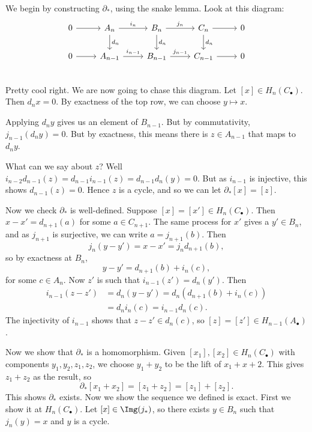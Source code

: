 \documentclass[12pt]{article}
\begin{document}
\begin{proofbox}
	We begin by constructing $\partial_\ast$, using the snake lemma. Look at this diagram:
	\begin{equation*}
	\begin{tikzcd}
		0 \arrow[r] & A_n \arrow[r, "i_n"] \arrow[d, "d_n"] & B_n \arrow[r, "j_n"] \arrow[d, "d_n"] & C_n \arrow[d, "d_n"] \arrow[r] & 0 \\
		0 \arrow[r] & A_{n-1} \arrow[r, "i_{n-1}"] & B_{n-1} \arrow[r, "j_{n-1}"] & C_{n-1} \arrow[r] & 0 \\
	\end{tikzcd}
	\end{equation*}
	Pretty cool right. We are now going to chase this diagram. Let $[x] \in H_n(C_\bullet)$. Then $d_n x = 0$. By exactness of the top row, we can choose $y \mapsto x$.

	Applying $d_n y$ gives us an element of $B_{n-1}$. But by commutativity, $j_{n-1}(d_n y) = 0$. But by exactness, this means there is $z \in A_{n-1}$ that maps to $d_{n} y$.

	What can we say about $z$? Well $i_{n-2} d_{n-1}(z) = d_{n-1} i_{n-1}(z) = d_{n-1} d_n (y) = 0$. But as $i_{n-1}$ is injective, this shows $d_{n-1}(z) = 0$. Hence $z$ is a cycle, and so we can let $\partial_\ast[x] = [z]$.

	Now we check $\partial_\ast$ is well-defined. Suppose $[x] = [x'] \in H_n(C_\bullet)$. Then $x - x' = d_{n+1}(a)$ for some $a \in C_{n+1}$. The same process for $x'$ gives a $y' \in B_n$, and as $j_{n+1}$ is surjective, we can write $a = j_{n+1}(b)$. Then
	\[
	j_n(y - y') = x- x' = j_n d_{n+1}(b),
	\]
	so by exactness at $B_n$,
	\[
	y - y' = d_{n+1}(b) + i_n(c),
	\]
	for some $c \in A_n$. Now $z'$ is such that $i_{n-1}(z') = d_n(y')$. Then
	\begin{align*}
		i_{n-1}(z - z') &= d_n(y - y') = d_n(d_{n+1}(b) + i_n(c)) \\
				&= d_n i_n(c) = i_{n-1} d_n(c).
	\end{align*}
	The injectivity of $i_{n-1}$ shows that $z - z' \in d_n(c)$, so $[z] = [z'] \in H_{n-1}(A_\bullet)$.

	Now we show that $\partial_\ast$ is a homomorphism. Given $[x_1], [x_2] \in H_n(C_\bullet)$ with components $y_1, y_2, z_1, z_2$, we choose $y_1 + y_2$ to be the lift of $x_1 + x+2$. This gives $z_1 + z_2$ as the result, so
	\[
		\partial_\ast[x_1 + x_2] = [z_1 + z_2] = [z_1] + [z_2].
	\]
	This shows $\partial_\ast$ exists. Now we show the sequence we defined is exact. First we show it at $H_n(C_\bullet)$. Let $[x] \in \Img(j_\ast)$, so there exists $y \in B_n$ such that $j_n(y) = x$ and $y$ is a cycle.


\end{proofbox}
\end{document}
